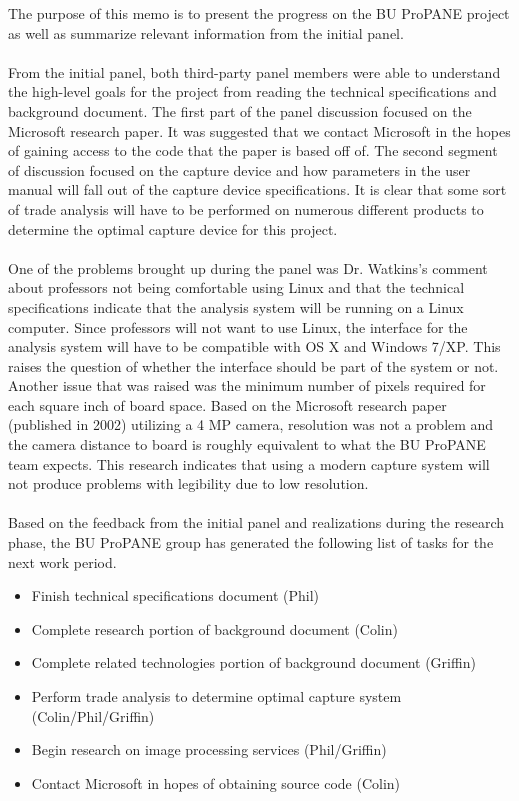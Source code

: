 \documentclass{texMemo}
\begin{document}
\maketitle
\noindent
The purpose of this memo is to present the progress on the BU ProPANE project as well as summarize relevant information from the  initial panel. \\
\\
From the initial panel, both third-party panel members were able to understand the high-level goals for the project from reading the technical specifications and background document. The first part of the panel discussion focused on the Microsoft research paper. It was suggested that we contact Microsoft in the hopes of gaining access to the code that the paper is based off of. The second segment of discussion focused on the capture device and how parameters in the user manual will fall out of the capture device specifications. It is clear that some sort of trade analysis will have to be performed on numerous different products to determine the optimal capture device for this project. \\
\\
One of the problems brought up during the panel was Dr. Watkins's comment about professors not being comfortable using Linux and that the technical specifications indicate that the analysis system will be running on a Linux computer. Since professors will not want to use Linux, the interface for the analysis system will have to be compatible with OS X and Windows 7/XP. This raises the question of whether the interface should be part of the system or not. Another issue that was raised was the minimum number of pixels required for each square inch of board space. Based on the Microsoft research paper (published in 2002) utilizing a 4 MP camera, resolution was not a problem and the camera distance to board is roughly equivalent to what the BU ProPANE team expects. This research indicates that using a modern capture system will not produce problems with legibility due to low resolution.\\
\\
Based on the feedback from the initial panel and realizations during the research phase, the BU ProPANE group has generated the following list of tasks for the next work period.
\begin{itemize}
	\item Finish technical specifications document (Phil)
	\item Complete research portion of background document (Colin)
	\item Complete related technologies portion of background document (Griffin)
	\item Perform trade analysis to determine optimal capture system (Colin/Phil/Griffin)
	\item Begin research on image processing services (Phil/Griffin)
	\item Contact Microsoft in hopes of obtaining source code (Colin)
\end{itemize}
\end{document}
